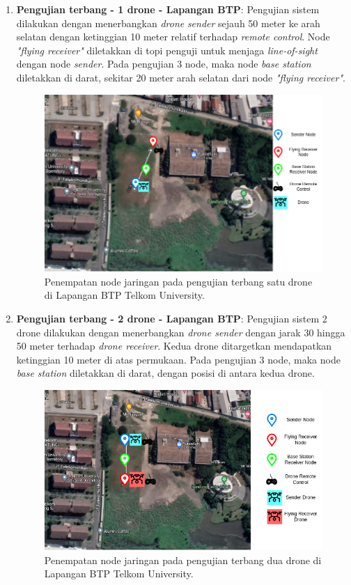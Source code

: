 \begin{enumerate}
	\item \textbf{Pengujian terbang - 1 drone - Lapangan BTP}: Pengujian sistem dilakukan dengan menerbangkan \textit{drone} \textit{sender} sejauh 50 meter ke arah selatan dengan ketinggian 10 meter relatif terhadap \textit{remote control}. Node \textit{"flying receiver"} diletakkan di topi penguji untuk menjaga \textit{line-of-sight} dengan node \textit{sender}. Pada pengujian 3 node, maka node \textit{base station} diletakkan di darat, sekitar 20 meter arah selatan dari node \textit{"flying receiver"}.
	\begin{figure}[H]
		\centering
		\includegraphics[scale=0.5]{./assets/PetaTerbangSatuBTP}
		\caption{Penempatan node jaringan pada pengujian terbang satu drone di Lapangan BTP Telkom University.}
	\end{figure}

	\item \textbf{Pengujian terbang - 2 drone - Lapangan BTP}: Pengujian sistem 2 drone dilakukan dengan menerbangkan \textit{drone sender} dengan jarak 30 hingga 50 meter terhadap \textit{drone receiver}. Kedua drone ditargetkan mendapatkan ketinggian 10 meter di atas permukaan. Pada pengujian 3 node, maka node \textit{base station} diletakkan di darat, dengan posisi di antara kedua drone.
	\begin{figure}[H]
		\centering
		\includegraphics[scale=0.5]{./assets/PetaTerbangDuaBTP}
		\caption{Penempatan node jaringan pada pengujian terbang dua drone di Lapangan BTP Telkom University.}
	\end{figure}

\end{enumerate}

